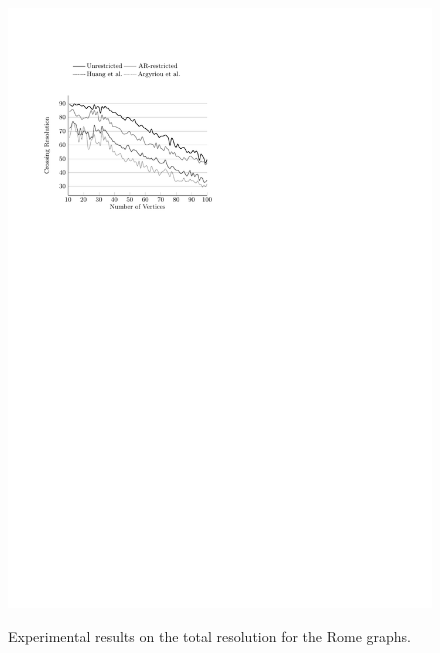 \documentclass{comjnl}
\begin{document}
\begin{figure}[t]
{	\includegraphics[scale=0.99,page=8]{figures/rome}}
	\caption{Experimental results on the total resolution for the Rome graphs.}
	\label{fig:to-res}
\end{figure}
\end{document}
